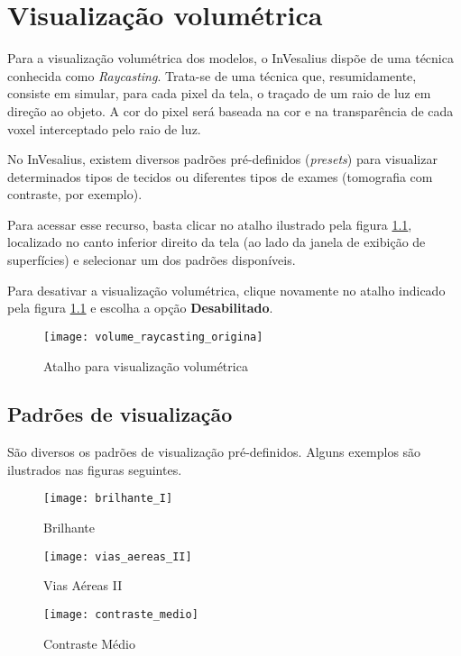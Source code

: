 \chapter{Visualização volumétrica}
\label{cap:vis_vol}

Para a visualização volumétrica dos modelos, o InVesalius dispõe de uma técnica
conhecida como \textit{Raycasting}. Trata-se de uma técnica que,
resumidamente, consiste em simular, para cada pixel da tela, o traçado de um raio de luz em
direção ao objeto. A cor do pixel será baseada na cor e na transparência de cada voxel
interceptado pelo raio de luz.

No InVesalius, existem diversos padrões pré-definidos (\textit{presets}) para visualizar
determinados tipos de tecidos ou diferentes tipos de exames (tomografia com contraste, por
exemplo).

Para acessar esse recurso, basta clicar no atalho ilustrado pela figura
\ref{fig:volume_raycasting_origina}, localizado no canto inferior direito da tela (ao lado da
janela de exibição de superfícies) e selecionar um dos padrões disponíveis.

Para desativar a visualização volumétrica, clique novamente no atalho indicado pela figura
\ref{fig:volume_raycasting_origina} e escolha a opção \textbf{Desabilitado}.

\begin{figure}[!htb]
\centering
\texttt{[image: volume\_raycasting\_origina]}
\caption{Atalho para visualização volumétrica}
\label{fig:volume_raycasting_origina}
\end{figure}

\section{Padrões de visualização}

São diversos os padrões de visualização pré-definidos. Alguns exemplos são ilustrados nas
figuras seguintes.

\begin{figure}[!htb]
\centering
\texttt{[image: brilhante\_I]}
\caption{Brilhante}
\label{fig:brilhante_I}
\end{figure}

\begin{figure}[!htb]
\centering 
\texttt{[image: vias\_aereas\_II]}
\caption{Vias Aéreas II}
\label{fig:vias_aereas_II} 
\end{figure}

\begin{figure}[!htb]
\centering
\texttt{[image: contraste\_medio]}
\caption{Contraste Médio}
\label{fig:contraste_medio}
\end{figure}

